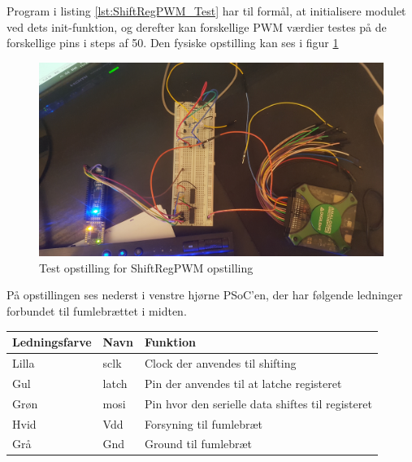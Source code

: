 \documentclass[Modultest/Modultest_main.tex]{subfiles}
\begin{document}
Program i listing \ref{lst:ShiftRegPWM_Test} har til formål, at initialisere modulet ved dets init-funktion, og derefter kan forskellige PWM værdier testes på de forskellige pins i steps af 50.
Den fysiske opstilling kan ses i figur \ref{fig:ShiftRegPWM_test}

\begin{figure}[H]
    \centering
    \includegraphics[width=\textwidth]{Modultest/CupLight/graphics/ShiftRegPWM_Test.jpg}
    \caption{Test opstilling for ShiftRegPWM opstilling}
    \label{fig:ShiftRegPWM_test}
\end{figure}

På opstillingen ses nederst i venstre hjørne PSoC'en, der har følgende ledninger forbundet til fumlebrættet i midten.

\begin{table}[H]
\centering
\begin{tabular}{|L{0.25\textwidth}|L{0.1\textwidth}|L{0.55\textwidth}|}
\hline
\textbf{Ledningsfarve} & \textbf{Navn} & \textbf{Funktion}                         \\ \hline
Lilla                  & sclk          & Clock der anvendes til shifting           \\ \hline
Gul                    & latch         & Pin der anvendes til at latche registeret \\ \hline
Grøn                   & mosi          & Pin hvor den serielle data shiftes til registeret \\ \hline
Hvid                   & Vdd           & Forsyning til fumlebræt                   \\ \hline
Grå                    & Gnd           & Ground til fumlebræt                      \\ \hline
\end{tabular}%

\end{table}
\end{document}
